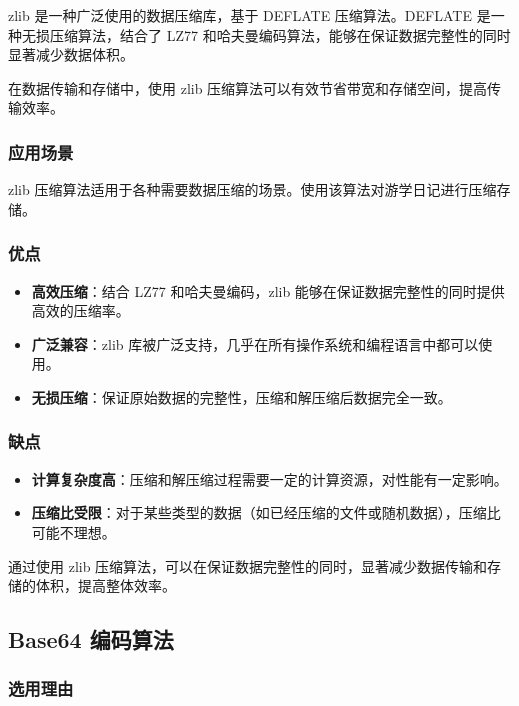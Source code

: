 \documentclass{ctexart}
\begin{document}
zlib 是一种广泛使用的数据压缩库，基于 DEFLATE 压缩算法。DEFLATE 是一种无损压缩算法，结合了 LZ77 和哈夫曼编码算法，能够在保证数据完整性的同时显著减少数据体积。

在数据传输和存储中，使用 zlib 压缩算法可以有效节省带宽和存储空间，提高传输效率。

\subsubsection{应用场景}

zlib 压缩算法适用于各种需要数据压缩的场景。使用该算法对游学日记进行压缩存储。

\subsubsection{优点}

\begin{itemize}
    \item \textbf{高效压缩}：结合 LZ77 和哈夫曼编码，zlib 能够在保证数据完整性的同时提供高效的压缩率。
    \item \textbf{广泛兼容}：zlib 库被广泛支持，几乎在所有操作系统和编程语言中都可以使用。
    \item \textbf{无损压缩}：保证原始数据的完整性，压缩和解压缩后数据完全一致。
\end{itemize}

\subsubsection{缺点}

\begin{itemize}
    \item \textbf{计算复杂度高}：压缩和解压缩过程需要一定的计算资源，对性能有一定影响。
    \item \textbf{压缩比受限}：对于某些类型的数据（如已经压缩的文件或随机数据），压缩比可能不理想。
\end{itemize}

通过使用 zlib 压缩算法，可以在保证数据完整性的同时，显著减少数据传输和存储的体积，提高整体效率。

\subsection{Base64 编码算法}

\subsubsection{选用理由}
\end{document}
